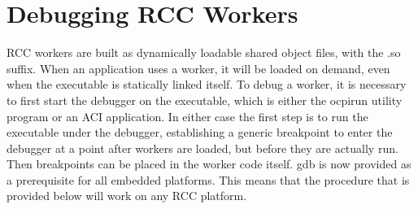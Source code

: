 \section{Debugging RCC Workers}
RCC workers are built as dynamically loadable shared object files, with the .so suffix.  When an application uses a worker, it will be loaded on demand, even when the executable is statically linked itself.  To debug a worker, it is necessary to first start the debugger on the executable, which is either the ocpirun utility program or an ACI application.  In either case the first step is to run the executable under the debugger, establishing a generic breakpoint to enter the debugger at a point after workers are loaded, but before they are actually run.  Then breakpoints can be placed in the worker code itself. gdb is now provided as a prerequisite for all embedded platforms.  This means that the procedure that is provided below will work on any RCC platform.

